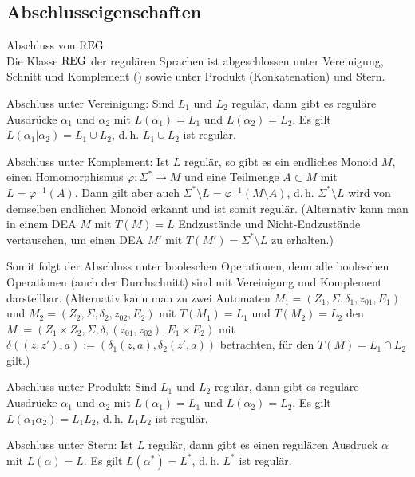 \pagebreak

\subsection{%
    Abschlusseigenschaften%
}

\begin{Satz}{Abschluss von $\text{REG}$}\\
    Die Klasse $\text{REG}$ der regulären Sprachen ist abgeschlossen unter
    Vereinigung, Schnitt und Komplement
    () sowie unter
    Produkt (Konkatenation) und Stern.
\end{Satz}

\begin{Beweis}
    Abschluss unter Vereinigung:
    Sind $L_1$ und $L_2$ regulär,
    dann gibt es reguläre Ausdrücke $\alpha_1$ und $\alpha_2$ mit
    $L(\alpha_1) = L_1$ und $L(\alpha_2) = L_2$.
    Es gilt $L(\alpha_1 | \alpha_2) = L_1 \cup L_2$, d.\,h.
    $L_1 \cup L_2$ ist regulär.

    Abschluss unter Komplement:
    Ist $L$ regulär, so gibt es ein endliches Monoid $M$, einen
    Homomorphismus $\varphi\colon \Sigma^\ast \rightarrow M$
    und eine Teilmenge $A \subset M$ mit $L = \varphi^{-1}(A)$.
    Dann gilt aber auch
    $\Sigma^\ast \setminus L = \varphi^{-1}(M \setminus A)$,
    d.\,h. $\Sigma^\ast \setminus L$ wird von demselben endlichen Monoid
    erkannt und ist somit regulär.
    (Alternativ kann man in einem DEA $M$ mit $T(M) = L$ Endzustände und
    Nicht-Endzustände vertauschen, um einen DEA $M'$ mit
    $T(M') = \Sigma^\ast \setminus L$ zu erhalten.)

    Somit folgt der Abschluss unter booleschen Operationen,
    denn alle booleschen Operationen (auch der Durchschnitt) sind mit
    Vereinigung und Komplement darstellbar.
    (Alternativ kann man zu zwei Automaten
    $M_1 = (Z_1, \Sigma, \delta_1, z_{01}, E_1)$ und
    $M_2 = (Z_2, \Sigma, \delta_2, z_{02}, E_2)$ mit
    $T(M_1) = L_1$ und $T(M_2) = L_2$ den 
    $M := (Z_1 \times Z_2, \Sigma, \delta, (z_{01}, z_{02}), E_1 \times E_2)$
    mit $\delta((z, z'), a) := (\delta_1(z, a), \delta_2(z', a))$
    betrachten, für den $T(M) = L_1 \cap L_2$ gilt.)

    Abschluss unter Produkt:
    Sind $L_1$ und $L_2$ regulär,
    dann gibt es reguläre Ausdrücke $\alpha_1$ und $\alpha_2$ mit
    $L(\alpha_1) = L_1$ und $L(\alpha_2) = L_2$.
    Es gilt $L(\alpha_1 \alpha_2) = L_1 L_2$, d.\,h.
    $L_1 L_2$ ist regulär.

    Abschluss unter Stern:
    Ist $L$ regulär, dann gibt es einen regulären Ausdruck $\alpha$ mit
    $L(\alpha) = L$.
    Es gilt $L(\alpha^\ast) = L^\ast$, d.\,h. $L^\ast$ ist regulär.
\end{Beweis}

